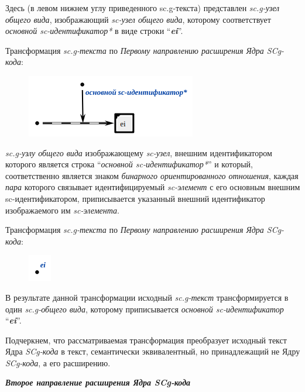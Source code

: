 Здесь (в левом нижнем углу приведенного sc.g-текста) представлен \textit{sc.g-узел общего вида}, изображающий \textit{sc-узел общего вида}, которому соответствует \textit{основной sc-идентификатор*} в виде строки ``\textbf{\textit{ei}}''.

\bigskip
Трансформация \textit{sc.g-текста} по \textit{Первому направлению расширения Ядра SCg-кода}:
\begin{figure}[h]
	\centering
	\includegraphics[scale=0.8]{images/intro/scg/scg_transf2.png}
\end{figure}
\textit{sc.g-узлу общего вида} изображающему \textit{sc-узел}, внешним идентификатором которого является строка ``\textit{основной sc-идентификатор*}'' и который, соответственно является знаком \textit{бинарного ориентированного отношения}, каждая \textit{пара} которого связывает идентифицируемый \textit{sc-элемент} с его основным внешним sc-идентификатором, приписывается указанный внешний идентификатор изображаемого им \textit{sc-элемента}.

\bigskip
Трансформация \textit{sc.g-текста} по \textit{Первому направлению расширения Ядра SCg-кода}:
\begin{figure}[h]
	\centering
	\includegraphics[scale=0.8]{images/intro/scg/scg_transf3.png}
\end{figure}

В результате данной трансформации исходный \mbox{\textit{sc.g-текст}} трансформируется в один \textit{sc.g-общего вида}, которому приписывается \textit{основной sc-идентификатор} ``\textit{\textbf{ei}}''.

Подчеркнем, что рассматриваемая трансформация преобразует исходный текст Ядра \textit{SCg-кода} в текст, семантически эквивалентный, но принадлежащий не Ядру \textit{SCg-кода}, а его расширению.

\textbf{\textit{Второе направление расширения Ядра SCg-кода}}

